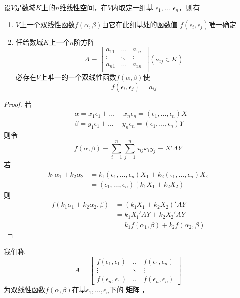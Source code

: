 \documentclass[11pt]{article}
\begin{document}
\begin{proposition}[]
\label{prop4.1.1}
设\(V\)是数域\(K\)上的\(n\)维线性空间，在\(V\)内取定一组基
\(\epsilon_1,\dots,\epsilon_n\)，则有
\begin{enumerate}
\item \(V\)上一个双线性函数\(f(\alpha,\beta)\)由它在此组基处的函数值
\(f(\epsilon_i,\epsilon_j)\)唯一确定
\item 任给数域\(K\)上一个\(n\)阶方阵
\begin{equation*}
A=
\begin{bmatrix}
a_{11}&\dots&a_{1n}\\
\vdots&\ddots&\vdots\\
a_{n1}&\dots&a_{nn}\\
\end{bmatrix}(a_{ij}\in K)
\end{equation*}
必存在\(V\)上唯一的一个双线性函数\(f(\alpha,\beta)\)使
\begin{equation*}
f(\epsilon_i,\epsilon_j)=a_{ij}
\end{equation*}
\end{enumerate}
\end{proposition}

\begin{proof}
若
\begin{align*}
&\alpha=x_1\epsilon_1+\dots+x_n\epsilon_n=(\epsilon_1,\dots,\epsilon_n)X\\
&\beta=y_1\epsilon_1+\dots+y_n\epsilon_n=(\epsilon_1,\dots,\epsilon_n)Y
\end{align*}
则令
\begin{equation*}
f(\alpha,\beta)=\sum_{i=1}^n\sum_{j=1}^na_{ij}x_iy_j=X'AY
\end{equation*}
若
\begin{align*}
k_1\alpha_1+k_2\alpha_2&=
k_1(\epsilon_1,\dots,\epsilon_n)X_1+k_2(\epsilon_1,\dots,\epsilon_n)X_2\\
&=(\epsilon_1,\dots,\epsilon_n)(k_1X_1+k_2X_2)
\end{align*}
则
\begin{align*}
f(k_1\alpha_1+k_2\alpha_2,\beta)&=(k_1X_1+k_2X_2)'AY\\
&=k_1X_1'AY+k_2X_2'AY\\
&=k_1f(\alpha_1,\beta)+k_2f(\alpha_2,\beta)
\end{align*}
\end{proof}

我们称
\begin{equation*}
A=
\begin{bmatrix}
f(\epsilon_1,\epsilon_1)&\dots&f(\epsilon_1,\epsilon_n)\\
\vdots&\ddots&\vdots\\
f(\epsilon_n,\epsilon_1)&\dots&f(\epsilon_n,\epsilon_n)
\end{bmatrix}
\end{equation*}
为双线性函数\(f(\alpha,\beta)\)在基\(\epsilon_1,\dots,\epsilon_n\)下的 \textbf{矩阵} ，
\end{document}
